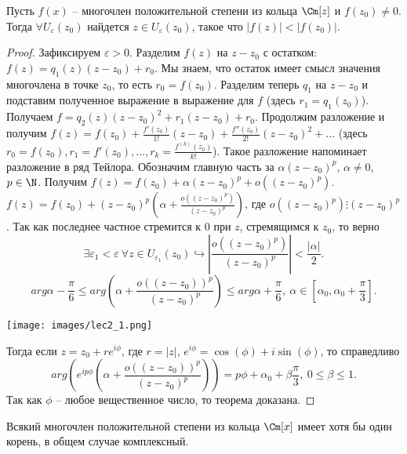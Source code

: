 \begin{lemma}[Д'Аламбера]
    \label{lemma6}
    Пусть $f(x)$ -- многочлен положительной степени из кольца $\Cm[z]$ и $f(z_0) \neq 0$. Тогда $\forall U_{\varepsilon}(z_0)$ найдется $z \in U_{\varepsilon}(z_0)$, такое что $|f(z)| < |f(z_0)|$.
\end{lemma}

\begin{proof}
    Зафиксируем $\varepsilon > 0$. Разделим $f(z)$ на $z - z_0$ с остатком: $f(z) = q_1(z) (z-z_0) + r_0$. Мы знаем, что остаток имеет смысл значения многочлена в точке $z_0$, то есть $r_0 = f(z_0)$. Разделим теперь $q_1$ на $z - z_0$ и подставим полученное выражение в выражение для $f$ (здесь $r_1 = q_1(z_0)$). Получаем 
    $f = q_2(z)(z-z_0)^2 + r_1(z-z_0) + r_0$. Продолжим разложение и получим
    $f(z) = f(z_0) + \frac{f'(z_0)}{1!}(z - z_0) + \frac{f''(z_0)}{2!}(z - z_0)^2 + \dots$ (здесь $r_0 = f(z_0), r_1 = f'(z_0), \ldots, r_k = \frac {f^{(k)}(z_0)}{k!}$). Такое разложение напоминает разложение в ряд Тейлора.
    Обозначим главную часть за $\alpha (z - z_0)^p$, $\alpha \neq 0$, $p \in \N$. Получим
    $f(z) = f(z_0) + \alpha (z-z_0)^p + o((z-z_0)^p)$.
    $f(z) = f(z_0) + (z - z_0)^p \left( \alpha + \frac{o((z-z_0)^p)}{(z-z_0)^p} \right)$, где $o((z - z_0)^p) \vdots (z - z_0)^p$. Так как последнее частное стремится к 0 при $z$, стремящимся к $z_0$, то верно
    $$\exists \varepsilon_1 < \varepsilon \ \forall z \in U_{\varepsilon_1}(z_0) \hookrightarrow \left| \frac {o((z-z_0)^p)}{(z-z_0)^p} \right| < \frac {|\alpha |}{2}.$$
    $$arg \alpha - \frac {\pi}{6} \leq arg(\alpha + \frac {o((z - z_0))^p}{(z - z_0)^p}) \leq arg \alpha + \frac {\pi}{6}, \ \alpha \in \left[\alpha_0, \alpha_0 + \frac {\pi}{3}\right].$$
    \begin{center}
        \texttt{[image: images/lec2\_1.png]}
    \end{center}
    Тогда если $z = z_0 + re^{i\phi}$, где $r = |z|$, $e^{i\phi} = \cos(\phi) + i\sin(\phi)$, то справедливо $$arg \left( e^{ip\phi} \left( \alpha + \frac {o((z-z_0))^p}{(z-z_0)^p}\right) \right) = p\phi + \alpha_0 + \beta \frac {\pi}{3}, \ 0 \leq \beta \leq 1.$$
    Так как $\phi$ -- любое вещественное число, то теорема доказана.
\end{proof}

\begin{theorem}
    \label{ota}
    Всякий многочлен положительной степени из кольца $\Cm[x]$ имеет хотя бы один корень, в общем случае комплексный.
\end{theorem}

